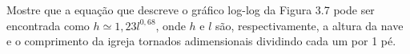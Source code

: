Mostre que a equação que descreve o gráfico log-log da Figura 3.7 pode ser encontrada como $h \simeq 1{,}23l^{0{,}68}$, onde $h$ e $l$ são, respectivamente, a altura da nave e o comprimento da igreja tornados adimensionais dividindo cada um por 1 pé.

